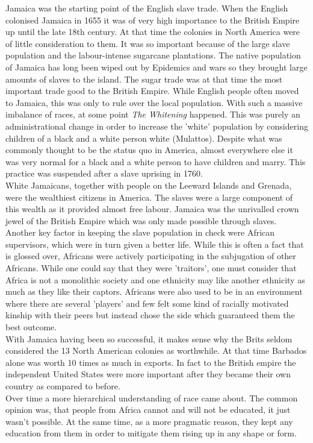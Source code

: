 \documentclass{article}
\begin{document}
	Jamaica was the starting point of the English slave trade. When the English colonised Jamaica in 1655 it was of very high importance to the British Empire up until the late 18th century. At that time the colonies in North America were of little consideration to them. It was so important because of the large slave population and the labour-intense sugarcane plantations. The native population of Jamaica has long been wiped out by Epidemics and wars so they brought large amounts of slaves to the island. The sugar trade was at that time the most important trade good to the British Empire. While English people often moved to Jamaica, this was only to rule over the local population. With such a massive imbalance of races, at some point \textit{The Whitening} happened. This was purely an administrational change in order to increase the 'white' population by considering children of a black and a white person white (Mulattos). Despite what was commonly thought to be the status quo in America, almost everywhere else it was very normal for a black and a white person to have children and marry. This practice was suspended after a slave uprising in 1760. \\
	White Jamaicans, together with people on the Leeward Islands and Grenada, were the wealthiest citizens in America. The slaves were a large component of this wealth as it provided almost free labour. Jamaica was the unrivalled crown jewel of the British Empire which was only made possible through slaves. Another key factor in keeping the slave population in check were African supervisors, which were in turn given a better life. While this is often a fact that is glossed over, Africans were actively participating in the subjugation of other Africans. While one could say that they were 'traitors', one must consider that Africa is not a monolithic society and one ethnicity may like another ethnicity as much as they like their captors. Africans were also used to be in an environment where there are several 'players' and few felt some kind of racially motivated kinship with their peers but instead chose the side which guaranteed them the best outcome. \\
	With Jamaica having been so successful, it makes sense why the Brits seldom considered the 13 North American colonies as worthwhile. At that time Barbados alone was worth 10 times as much in exports. In fact to the British empire the independent United States were more important after they became their own country as compared to before. \\
	Over time a more hierarchical understanding of race came about. The common opinion was, that people from Africa cannot and will not be educated, it just wasn't possible. At the same time, as a more pragmatic reason, they kept any education from them in order to mitigate them rising up in any shape or form. \\
\end{document}
